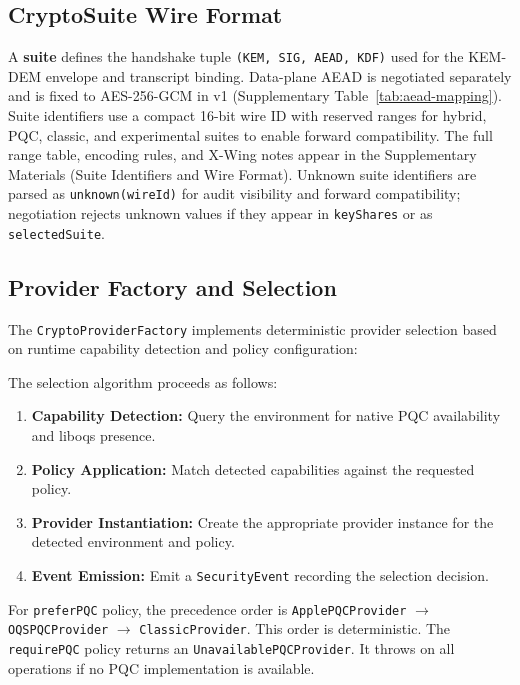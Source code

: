 \documentclass[10pt,journal,compsoc]{IEEEtran}
\providecommand{\tightlist}{%
  \setlength{\itemsep}{0pt}\setlength{\parskip}{0pt}}
\begin{document}
\subsection{CryptoSuite Wire
Format}\label{c.-cryptosuite-wire-format}

A \textbf{suite} defines the handshake tuple
\texttt{(KEM,\ SIG,\ AEAD,\ KDF)} used for the KEM-DEM envelope and
transcript binding. Data-plane AEAD is negotiated separately and is
fixed to AES-256-GCM in v1 (Supplementary Table~\ref{tab:aead-mapping}). Suite identifiers use a compact
16-bit wire ID with reserved ranges for hybrid, PQC, classic, and
experimental suites to enable forward compatibility. The full range
table, encoding rules, and X-Wing notes appear in the Supplementary
Materials (Suite Identifiers and Wire Format). Unknown suite identifiers
are parsed as \texttt{unknown(wireId)} for audit visibility and forward
compatibility; negotiation rejects unknown values if they appear in
\texttt{keyShares} or as \texttt{selectedSuite}.

\subsection{Provider Factory and
Selection}\label{d.-provider-factory-and-selection}

The \texttt{CryptoProviderFactory} implements deterministic provider
selection based on runtime capability detection and policy
configuration:


The selection algorithm proceeds as follows:

\begin{enumerate}\raggedright
\tightlist
\item
  \textbf{Capability Detection:} Query the environment for native PQC
  availability and liboqs presence.
\item
  \textbf{Policy Application:} Match detected capabilities against the
  requested policy.
\item
  \textbf{Provider Instantiation:} Create the appropriate provider
  instance for the detected environment and policy.
\item
  \textbf{Event Emission:} Emit a \texttt{SecurityEvent} recording the
  selection decision.
\end{enumerate}

{\raggedright
For \texttt{preferPQC} policy, the precedence order is
\texttt{ApplePQCProvider} $\rightarrow$ \texttt{OQSPQCProvider} $\rightarrow$
\texttt{ClassicProvider}. This order is deterministic. The
\texttt{requirePQC} policy returns an \texttt{UnavailablePQCProvider}. It
throws on all operations if no PQC implementation is available.\par}
\end{document}
